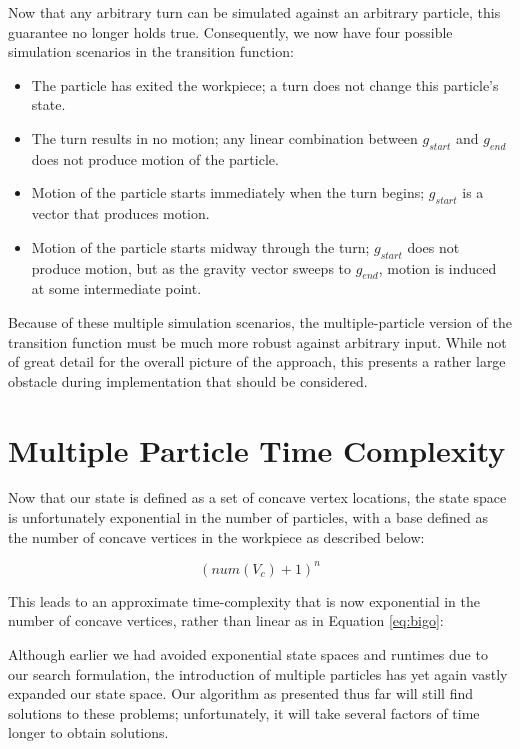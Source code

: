 Now that any arbitrary turn can be simulated against an arbitrary particle, this guarantee no longer holds true. Consequently, we now have four possible simulation scenarios in the transition function:


\begin{itemize}
\item The particle has exited the workpiece; a turn does not change this particle's state.
\item The turn results in no motion; any linear combination between $g_{start}$ and $g_{end}$ does not produce motion of the particle.
\item Motion of the particle starts immediately when the turn begins; $g_{start}$ is a vector that produces motion.
\item Motion of the particle starts midway through the turn; $g_{start}$ does not produce motion, but as the gravity vector sweeps to $g_{end}$, motion is induced at some intermediate point.
\end{itemize}

Because of these multiple simulation scenarios, the multiple-particle version of the transition function must be much more robust against arbitrary input. While not of great detail for the overall picture of the approach, this presents a rather large obstacle during implementation that should be considered.

\section{Multiple Particle Time Complexity}

Now that our state is defined as a set of concave vertex locations, the state space is unfortunately exponential in the number of particles, with a base defined as the number of concave vertices in the workpiece as described below:

$$
(num(V_{c}) + 1)^n
$$

This leads to an approximate time-complexity that is now exponential in the number of concave vertices, rather than linear as in Equation \eqref{eq:bigo}:

 {
  \label{eq:bigoTotal}
}

Although earlier we had avoided exponential state spaces and runtimes due to our search formulation, the introduction of multiple particles has yet again vastly expanded our state space. Our algorithm as presented thus far will still find solutions to these problems; unfortunately, it will take several factors of time longer to obtain solutions.

